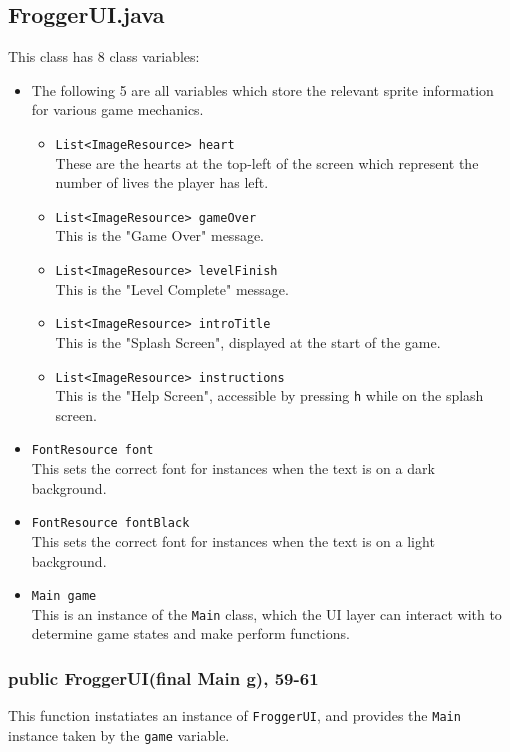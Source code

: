 \documentclass[12pt]{article}
\begin{document}
\subsection{FroggerUI.java}
This class has 8 class variables:
\begin{itemize}
  \item The following 5 are all variables which store the relevant sprite information for various game mechanics.
    \begin{itemize}
      \item \verb|List<ImageResource> heart|\\
            These are the hearts at the top-left of the screen which represent the number of lives the player has left.
      \item \verb|List<ImageResource> gameOver|\\
            This is the "Game Over" message.
      \item \verb|List<ImageResource> levelFinish|\\
            This is the "Level Complete" message.
      \item \verb|List<ImageResource> introTitle|\\
            This is the "Splash Screen", displayed at the start of the game.
      \item \verb|List<ImageResource> instructions|\\
            This is the "Help Screen", accessible by pressing \verb|h| while on the splash screen.
    \end{itemize}
  \item \verb|FontResource font|\\
        This sets the correct font for instances when the text is on a dark background.
  \item \verb|FontResource fontBlack|\\
        This sets the correct font for instances when the text is on a light background.
  \item \verb|Main game|\\
        This is an instance of the \verb|Main| class, which the UI layer can interact with to determine game states and make perform functions.
\end{itemize}

\subsubsection{public FroggerUI(final Main g), 59-61}
This function instatiates an instance of \verb|FroggerUI|, and provides the \verb|Main| instance taken by the \verb|game| variable.
\end{document}
